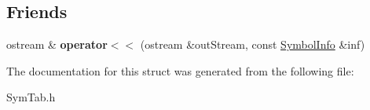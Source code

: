\subsection*{Friends}
\begin{DoxyCompactItemize}
\item 
\hypertarget{structSymbolInfo_a4fdd5318cd23696f82e8b29daa716504}{ostream \& {\bfseries operator$<$$<$} (ostream \&out\-Stream, const \hyperlink{structSymbolInfo}{Symbol\-Info} \&inf)}\label{structSymbolInfo_a4fdd5318cd23696f82e8b29daa716504}

\end{DoxyCompactItemize}


The documentation for this struct was generated from the following file\-:\begin{DoxyCompactItemize}
\item 
Sym\-Tab.\-h\end{DoxyCompactItemize}
